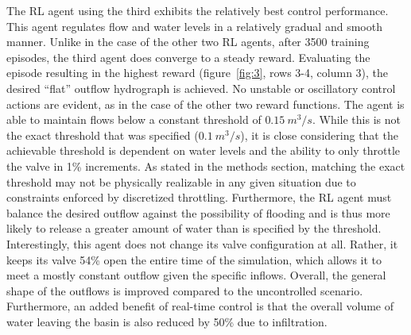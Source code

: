 The RL agent using the third   exhibits the relatively best control performance.
This agent regulates flow and water levels in a relatively gradual and smooth manner.
Unlike in the case of the other two RL agents, after 3500 training episodes, the third agent does converge to a steady reward.
Evaluating the episode resulting in the highest reward (figure~\ref{fig:3}, rows 3-4, column 3), the desired “flat” outflow hydrograph is achieved.
No unstable or oscillatory control actions are evident, as in the case of the other two reward functions.
The agent is able to maintain flows below a constant threshold of $0.15\ m^3/s$.
While this is not the exact threshold that was specified ($0.1\ m^3/s$), it is close considering that the achievable threshold is dependent on water levels and the ability to only throttle the valve in 1\% increments.
As stated in the methods section, matching the exact threshold may not be physically realizable in any given situation due to constraints enforced by discretized throttling.
Furthermore, the RL agent must balance the desired outflow against the possibility of flooding and is thus more likely to release a greater amount of water than is specified by the threshold. Interestingly, this agent does not change its valve configuration at all.
Rather, it keeps its valve 54\% open the entire time of the simulation, which allows it to meet a mostly constant outflow given the specific inflows. Overall, the general shape of the outflows is improved compared to the uncontrolled scenario.
Furthermore, an added benefit of real-time control is that the overall volume of water leaving the basin is also reduced by 50\% due to infiltration.


